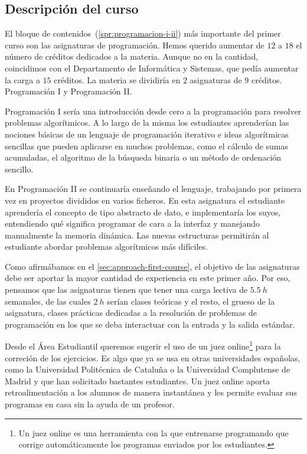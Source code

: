 \subsection{Descripción del curso}

El bloque de contenidos~(\cref{spr:programacion-i-ii})
más importante del primer curso son las asignaturas de programación.
Hemos querido aumentar de $12$ a $18$ el número de créditos
dedicados a la materia.
Aunque no en la cantidad,
coincidimos con el Departamento de Informática y Sistemas,
que pedía aumentar la carga a $15$ créditos.
La materia se dividiría en $2$ asignaturas de $9$ créditos.
Programación I y Programación II.

Programación I sería una introducción desde cero a la programación
para resolver problemas algorítmicos.
A lo largo de la misma los estudiantes aprenderían las nociones básicas
de un lenguaje de programación iterativo e
ideas algorítmicas sencillas que pueden aplicarse en muchos problemas,
como el cálculo de sumas acumuladas,
el algoritmo de la búsqueda binaria
o un método de ordenación sencillo.

En Programación II se continuaría enseñando el lenguaje,
trabajando por primera vez en proyectos divididos en varios ficheros.
En esta asignatura el estudiante aprendería
el concepto de tipo abstracto de dato,
e implementaría los suyos,
entendiendo qué significa programar de cara a la interfaz
y manejando manualmente la memoria dinámica.
Las nuevas estructuras permitirán al estudiante
abordar problemas algorítmicos más difíciles.

Como afirmábamos en el \cref{sec:approach-first-course},
el objetivo de las asignaturas debe ser
aportar la mayor cantidad de experiencia en este primer año.
Por eso, pensamos que las asignaturas
tienen que tener una carga lectiva de $\SI{5.5}{h}$ semanales,
de las cuales $\SI{2}{h}$ serían clases teóricas y el resto,
el grueso de la asignatura,
clases prácticas dedicadas a la resolución de problemas de programación
en los que se deba interactuar con la entrada y la salida estándar.

Desde el Área Estudiantil queremos sugerir el uso de un juez online\footnote{
    Un juez online es una herramienta con la que entrenarse programando
    que corrige automáticamente los programas enviados por los estudiantes.
} para la correción de los ejercicios.
Es algo que ya se usa en otras universidades españolas,
como la Universidad Politécnica de Cataluña o
la Universidad Complutense de Madrid y
que han solicitado bastantes estudiantes.
Un juez online aporta retroalimentación a los alumnos de manera instantánea
y les permite evaluar sus programas en casa sin la ayuda de un profesor.

